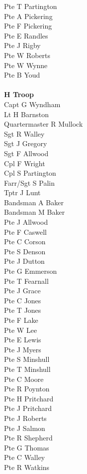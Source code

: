 \begin{multicols}{3}
  Pte T Partington \\
  Pte A Pickering \\
  Pte F Pickering \\
  Pte E Randles \\
  Pte J Rigby \\
  Pte W Roberts \\
  Pte W Wynne \\
  Pte B Youd \\
  \\
  \textbf{H Troop} \\
  Capt G Wyndham \\
  Lt H Barnston \\
  Quartermaster R Mullock \\
  Sgt R Walley \\
  Sgt J Gregory \\
  Sgt F Allwood \\
  Cpl F Wright \\
  Cpl S Partington \\
  Farr/Sgt S Palin \\
  Tptr J Lunt \\
  Bandsman A Baker \\
  Bandsman M Baker \\
  Pte J Allwood \\
  Pte F Caswell \\
  Pte C Corson \\
  Pte S Denson \\
  Pte J Dutton \\
  Pte G Emmerson \\
  Pte T Fearnall \\
  Pte J Grace \\
  Pte C Jones \\
  Pte T Jones \\
  Pte F Lake \\
  Pte W Lee \\
  Pte E Lewis \\
  Pte J Myers \\
  Pte S Minshull \\
  Pte T Minshull \\
  Pte C Moore \\
  Pte R Poynton \\
  Pte H Pritchard \\
  Pte J Pritchard \\
  Pte J Roberts \\
  Pte J Salmon \\
  Pte R Shepherd \\
  Pte G Thomas \\
  Pte C Walley \\
  Pte R Watkins \\
 \end{multicols}

